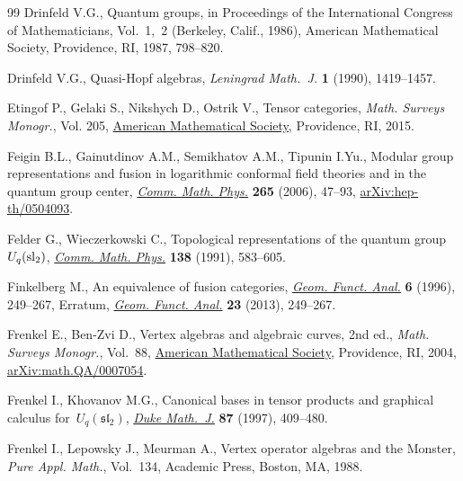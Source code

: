 \documentclass[10pt,a4paper]{amsart}
\numberwithin{equation}{section}
\begin{document}
\begin{thebibliography}{99}
Drinfeld V.G., Quantum groups, in Proceedings of the {I}nternational {C}ongress
 of {M}athematicians, {V}ol.~1,~2 ({B}erkeley, {C}alif., 1986), American
 Mathematical Society, Providence, RI, 1987, 798--820.

Drinfeld V.G., Quasi-{H}opf algebras, \textit{Leningrad Math.~J.} \textbf{1}
 (1990), 1419--1457.

Etingof P., Gelaki S., Nikshych D., Ostrik V., Tensor categories, \textit{Math.
 Surveys Monogr.}, Vol. 205, \href{https://doi.org/10.1090/surv/205}{American
 Mathematical Society}, Providence, RI, 2015.

Feigin B.L., Gainutdinov A.M., Semikhatov A.M., Tipunin I.Yu., Modular group
 representations and fusion in logarithmic conformal field theories and in the
 quantum group center,
 \href{https://doi.org/10.1007/s00220-006-1551-6}{\textit{Comm. Math. Phys.}}
 \textbf{265} (2006), 47--93,
 \href{http://arxiv.org/abs/hep-th/0504093}{arXiv:hep-th/0504093}.

Felder G., Wieczerkowski C., Topological representations of the quantum
 group~{$U_q({\rm sl}_2)$},
 \href{https://doi.org/10.1007/BF02102043}{\textit{Comm. Math. Phys.}}
 \textbf{138} (1991), 583--605.

Finkelberg M., An equivalence of fusion categories,
 \href{https://doi.org/10.1007/BF02247887}{\textit{Geom. Funct. Anal.}}
 \textbf{6} (1996), 249--267, {E}rratum,
 \href{https://doi.org/10.1007/s00039-013-0230-y}{\textit{Geom. Funct. Anal.}}
 \textbf{23} (2013), 249--267.

Frenkel E., Ben-Zvi D., Vertex algebras and algebraic curves, 2nd ed., \textit{Math.
 Surveys Monogr.}, Vol.~88,
 \href{https://doi.org/10.1090/surv/088}{American Mathematical Society},
 Providence, RI, 2004,
 \href{http://arxiv.org/abs/math.QA/0007054}{arXiv:math.QA/0007054}.

Frenkel I., Khovanov M.G., Canonical bases in tensor products and graphical
 calculus for~{$U_q({\mathfrak s}{\mathfrak l}_2)$},
 \href{https://doi.org/10.1215/S0012-7094-97-08715-9}{\textit{Duke Math.~J.}}
 \textbf{87} (1997), 409--480.

Frenkel I., Lepowsky J., Meurman A., Vertex operator algebras and the
 {M}onster, \textit{Pure Appl. Math.}, Vol.~134, Academic Press, Boston, MA,
 1988.


\end{thebibliography}
\end{document}
